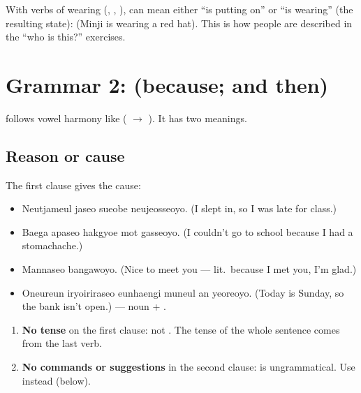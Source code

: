 \begin{remark}
With verbs of wearing (, , ),  can mean
either ``is putting on'' or ``is wearing'' (the resulting state):  (Minji is wearing a red hat). This is how people are described in
the ``who is this?'' exercises.
\end{remark}

\section{Grammar 2:  (because; and then)}

 follows vowel harmony like  ( $\to$
). It has two meanings.

\subsection{Reason or cause}

\begin{example}[Reasons]
The first clause gives the cause:
\begin{itemize}
  \item {} Neutjameul jaseo sueobe neujeosseoyo. (I slept
        in, so I was late for class.)
  \item {} Baega apaseo hakgyoe mot gasseoyo. (I
        couldn't go to school because I had a stomachache.)
  \item {} Mannaseo bangawoyo. (Nice to meet you --- lit.\ because I
        met you, I'm glad.)
  \item {} Oneureun iryoiriraseo eunhaengi
        muneul an yeoreoyo. (Today is Sunday, so the bank isn't open.) --- noun +
        .
\end{itemize}
\end{example}

\begin{important}
\begin{enumerate}
  \item \textbf{No tense} on the first clause:  not .
        The tense of the whole sentence comes from the last verb.
  \item \textbf{No commands or suggestions} in the second clause:  is ungrammatical. Use  instead (below).
\end{enumerate}
\end{important}

